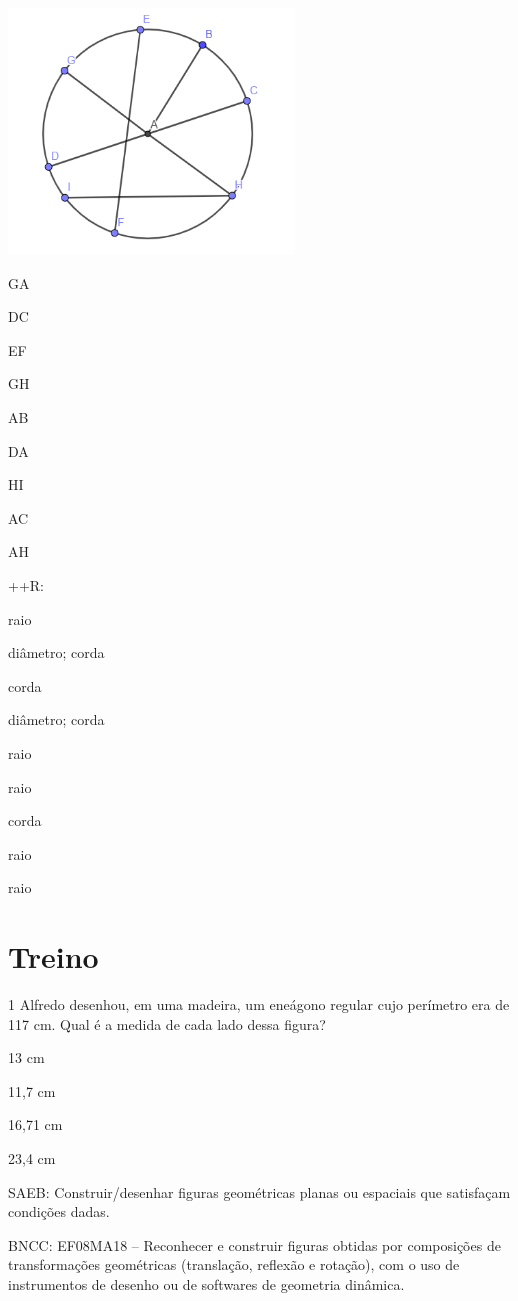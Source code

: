 {\includegraphics[width=2.98681in,height=2.57292in]{./imgSAEB_8_MAT/media/image12.png}
\item GA
\item DC
\item EF
\item GH
\item AB
\item DA
\item HI
\item AC
\item AH

++R:
\item raio
\item diâmetro; corda
\item corda
\item diâmetro; corda
\item raio
\item raio
\item corda
\item raio
\item raio

\section{Treino}

\num{1} Alfredo desenhou, em uma madeira, um eneágono regular cujo perímetro
era de 117 cm. Qual é a medida de cada lado dessa figura?
\item 13 cm
\item 11,7 cm
\item 16,71 cm
\item 23,4 cm

SAEB: Construir/desenhar figuras geométricas planas ou espaciais que
satisfaçam condições dadas.

BNCC: EF08MA18 -- Reconhecer e construir figuras obtidas por composições
de transformações geométricas (translação, reflexão e rotação), com o
uso de instrumentos de desenho ou de softwares de geometria dinâmica.

}

